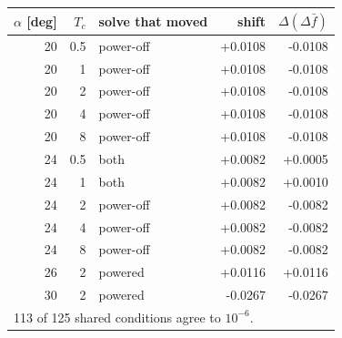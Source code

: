 \begin{tabular}{rrlrr}
  \hline
  $\alpha$ [deg] & $T_c$ & solve that moved & shift & $\Delta(\Delta \bar f)$ \\
  \hline
  20 & 0.5 & power-off & +0.0108 & -0.0108 \\
  20 & 1 & power-off & +0.0108 & -0.0108 \\
  20 & 2 & power-off & +0.0108 & -0.0108 \\
  20 & 4 & power-off & +0.0108 & -0.0108 \\
  20 & 8 & power-off & +0.0108 & -0.0108 \\
  24 & 0.5 & both & +0.0082 & +0.0005 \\
  24 & 1 & both & +0.0082 & +0.0010 \\
  24 & 2 & power-off & +0.0082 & -0.0082 \\
  24 & 4 & power-off & +0.0082 & -0.0082 \\
  24 & 8 & power-off & +0.0082 & -0.0082 \\
  26 & 2 & powered & +0.0116 & +0.0116 \\
  30 & 2 & powered & -0.0267 & -0.0267 \\
  \hline
  \multicolumn{5}{l}{\footnotesize 113 of 125 shared conditions agree to $10^{-6}$.} \\
  \hline
\end{tabular}
